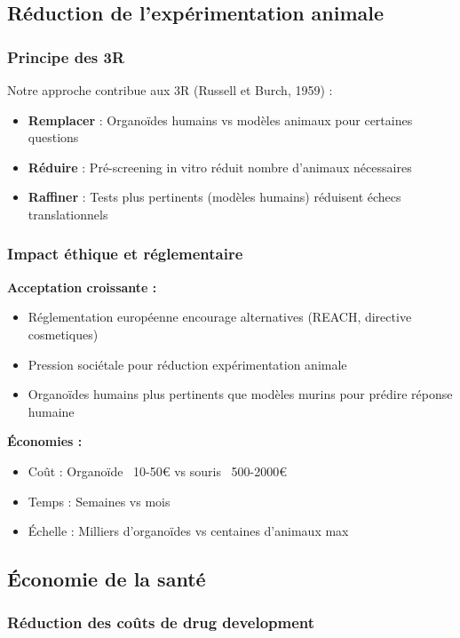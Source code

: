 \subsection{Réduction de l'expérimentation animale}

\subsubsection{Principe des 3R}

Notre approche contribue aux 3R (Russell et Burch, 1959) :
\begin{itemize}
    \item \textbf{Remplacer} : Organoïdes humains vs modèles animaux pour certaines questions
    \item \textbf{Réduire} : Pré-screening in vitro réduit nombre d'animaux nécessaires
    \item \textbf{Raffiner} : Tests plus pertinents (modèles humains) réduisent échecs translationnels
\end{itemize}

\subsubsection{Impact éthique et réglementaire}

\textbf{Acceptation croissante :}
\begin{itemize}
    \item Réglementation européenne encourage alternatives (REACH, directive cosmetiques)
    \item Pression sociétale pour réduction expérimentation animale
    \item Organoïdes humains plus pertinents que modèles murins pour prédire réponse humaine
\end{itemize}

\textbf{Économies :}
\begin{itemize}
    \item Coût : Organoïde ~10-50€ vs souris ~500-2000€
    \item Temps : Semaines vs mois
    \item Échelle : Milliers d'organoïdes vs centaines d'animaux max
\end{itemize}

\subsection{Économie de la santé}

\subsubsection{Réduction des coûts de drug development}

